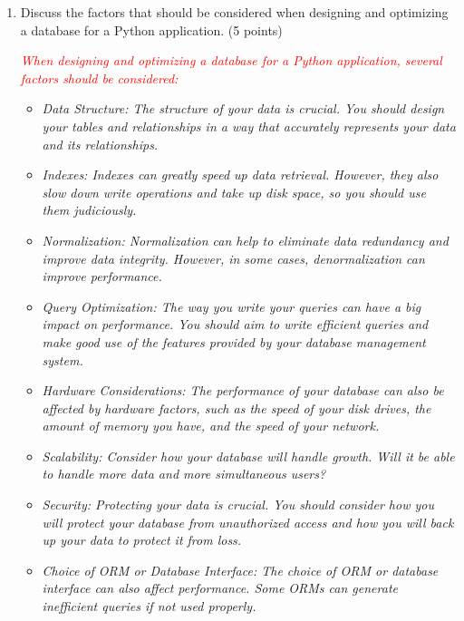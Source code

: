 \documentclass{article}
\begin{document}
\begin{enumerate}
        \item Discuss the factors that should be considered when designing and optimizing
          a database for a Python application. (5 points)\par
          \textcolor{red}{\textit{When designing and optimizing a database for a Python application, several factors should be considered:}}
          \begin{itemize}
            \color{red}
            \item \textit{Data Structure: The structure of your data is crucial. 
            You should design your tables and relationships in a way that accurately represents your data and its relationships.}
            \item \textit{Indexes: Indexes can greatly speed up data retrieval. However,
             they also slow down write operations and take up disk space, so you should use them judiciously.}            
           \item \textit{Normalization: Normalization can help to eliminate data redundancy and improve data integrity. 
           However, in some cases, denormalization can improve performance.}             
            \item \textit{Query Optimization: The way you write your queries can have a big impact on performance. 
            You should aim to write efficient queries and make good use of the features provided by your database management system.}
            \item \textit{Hardware Considerations: The performance of your database can also be affected by hardware factors, 
            such as the speed of your disk drives, the amount of memory you have, and the speed of your network.}
            \item \textit{Scalability: Consider how your database will handle growth. 
            Will it be able to handle more data and more simultaneous users?}
            \item \textit{Security: Protecting your data is crucial. You should consider how you will protect your database 
            from unauthorized access and how you will back up your data to protect it from loss.}
            \item \textit{Choice of ORM or Database Interface: The choice of ORM or database interface can also affect performance. 
            Some ORMs can generate inefficient queries if not used properly.}
          \end{itemize}


\end{enumerate}
\end{document}
